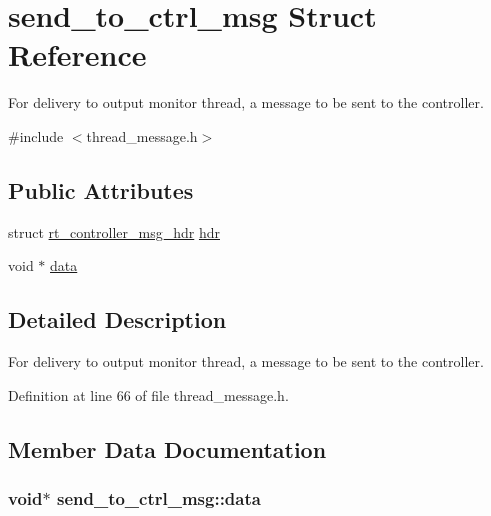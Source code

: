 \hypertarget{structsend__to__ctrl__msg}{\section{send\-\_\-to\-\_\-ctrl\-\_\-msg Struct Reference}
\label{structsend__to__ctrl__msg}
}


For delivery to output monitor thread, a message to be sent to the controller.  




{\ttfamily \#include $<$thread\-\_\-message.\-h$>$}

\subsection*{Public Attributes}
\begin{DoxyCompactItemize}
\item 
struct \hyperlink{structrt__controller__msg__hdr}{rt\-\_\-controller\-\_\-msg\-\_\-hdr} \hyperlink{structsend__to__ctrl__msg_a0081ea72ec0c3835e350ff584a3a4224}{hdr}
\item 
void $\ast$ \hyperlink{structsend__to__ctrl__msg_abbc7f8e78c9e656192e712b5f193d8cd}{data}
\end{DoxyCompactItemize}


\subsection{Detailed Description}
For delivery to output monitor thread, a message to be sent to the controller. 

Definition at line 66 of file thread\-\_\-message.\-h.



\subsection{Member Data Documentation}
\hypertarget{structsend__to__ctrl__msg_abbc7f8e78c9e656192e712b5f193d8cd}{
\subsubsection[{data}]{\setlength{\rightskip}{0pt plus 5cm}void$\ast$ send\-\_\-to\-\_\-ctrl\-\_\-msg\-::data}}\label{structsend__to__ctrl__msg_abbc7f8e78c9e656192e712b5f193d8cd}


